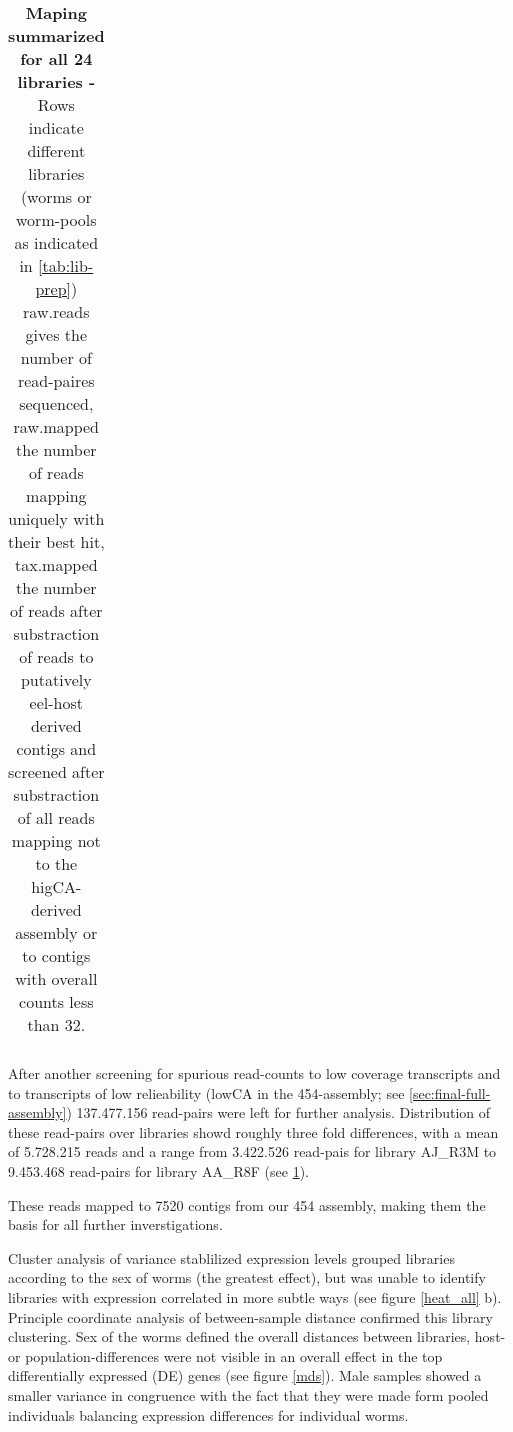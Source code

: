 \begin{table}[h]
\begin{center}
\begin{tabular}{llrrr}
   \hline
\end{tabular}
\caption[mapping Summary]{\textbf{Maping summarized for all 24
    libraries -} Rows indicate different libraries (worms or
  worm-pools as indicated in \ref{tab:lib-prep}) raw.reads gives the
  number of read-paires sequenced, raw.mapped the number of reads
  mapping uniquely with their best hit, tax.mapped the number of reads
  after substraction of reads to putatively eel-host derived contigs
  and screened after substraction of all reads mapping not to the
  higCA-derived assembly or to contigs with overall counts less than
  32.}
\label{tab:read-clean}
\end{center}
\end{table}


After another screening for spurious read-counts to low coverage
transcripts and to transcripts of low relieability (lowCA in the
454-assembly; see \ref{sec:final-full-assembly}) 137.477.156
read-pairs were left for further analysis. Distribution of these
read-pairs over libraries showd roughly three fold differences, with a
mean of 5.728.215 reads and a range from 3.422.526 read-pais for
library AJ\_R3M to 9.453.468 read-pairs for library AA\_R8F (see
\ref{tab:read-clean}).


\afterpage{\clearpage}

These reads mapped to 7520 contigs from our 454 assembly, making them
the basis for all further inverstigations. 

Cluster analysis of variance stablilized expression levels grouped
libraries according to the sex of worms (the greatest effect), but was
unable to identify libraries with expression correlated in more subtle
ways (see figure \ref{heat_all} b). Principle coordinate analysis of
between-sample distance confirmed this library clustering. Sex of the
worms defined the overall distances between libraries, host- or
population-differences were not visible in an overall effect in the
top differentially expressed (DE) genes (see figure \ref{mds}). Male
samples showed a smaller variance in congruence with the fact that
they were made form pooled individuals balancing expression
differences for individual worms.

